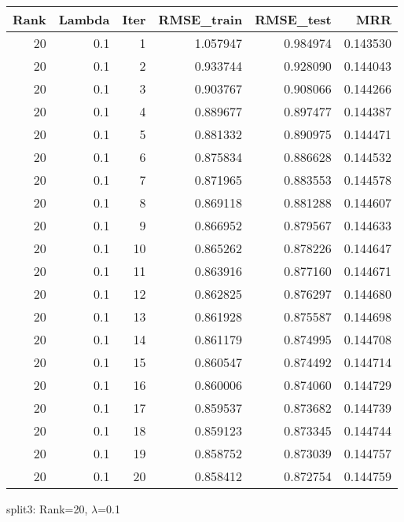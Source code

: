 \begin{tabular}{rrrrrr}
\toprule
 Rank &  Lambda &  Iter &  RMSE\_train &  RMSE\_test &       MRR \\
\midrule
   20 &     0.1 &     1 &    1.057947 &   0.984974 &  0.143530 \\
   20 &     0.1 &     2 &    0.933744 &   0.928090 &  0.144043 \\
   20 &     0.1 &     3 &    0.903767 &   0.908066 &  0.144266 \\
   20 &     0.1 &     4 &    0.889677 &   0.897477 &  0.144387 \\
   20 &     0.1 &     5 &    0.881332 &   0.890975 &  0.144471 \\
   20 &     0.1 &     6 &    0.875834 &   0.886628 &  0.144532 \\
   20 &     0.1 &     7 &    0.871965 &   0.883553 &  0.144578 \\
   20 &     0.1 &     8 &    0.869118 &   0.881288 &  0.144607 \\
   20 &     0.1 &     9 &    0.866952 &   0.879567 &  0.144633 \\
   20 &     0.1 &    10 &    0.865262 &   0.878226 &  0.144647 \\
   20 &     0.1 &    11 &    0.863916 &   0.877160 &  0.144671 \\
   20 &     0.1 &    12 &    0.862825 &   0.876297 &  0.144680 \\
   20 &     0.1 &    13 &    0.861928 &   0.875587 &  0.144698 \\
   20 &     0.1 &    14 &    0.861179 &   0.874995 &  0.144708 \\
   20 &     0.1 &    15 &    0.860547 &   0.874492 &  0.144714 \\
   20 &     0.1 &    16 &    0.860006 &   0.874060 &  0.144729 \\
   20 &     0.1 &    17 &    0.859537 &   0.873682 &  0.144739 \\
   20 &     0.1 &    18 &    0.859123 &   0.873345 &  0.144744 \\
   20 &     0.1 &    19 &    0.858752 &   0.873039 &  0.144757 \\
   20 &     0.1 &    20 &    0.858412 &   0.872754 &  0.144759 \\
\bottomrule
\end{tabular}

\caption{split3: Rank=20, $\lambda$=0.1}
